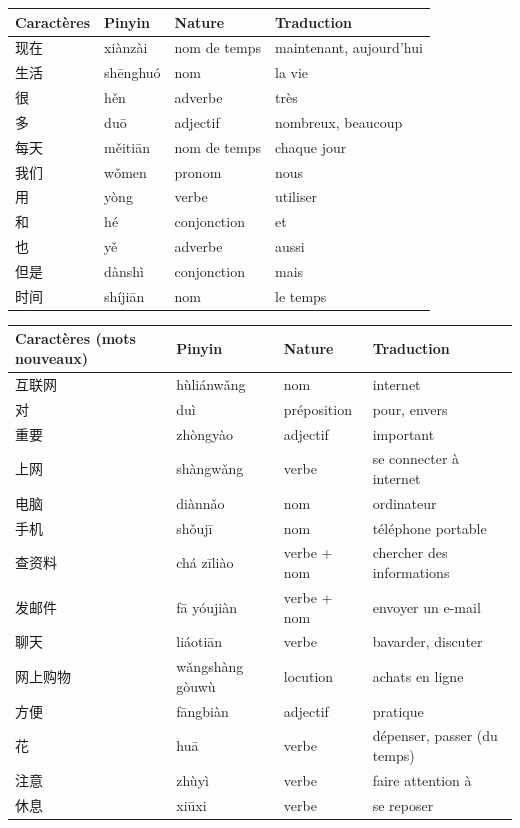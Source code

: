 \documentclass[11pt]{article}
\begin{document}
\begin{center}
\begin{tabularx}{\linewidth}{|X|X|X|X|}
\hline
\rowcolor{popblueL} Caractères & Pinyin & Nature & Traduction \\
\hline
现在 & xiànzài & nom de temps & maintenant, aujourd'hui \\
\hline
生活 & shēnghuó & nom & la vie \\
\hline
很 & hěn & adverbe & très \\
\hline
多 & duō & adjectif & nombreux, beaucoup \\
\hline
每天 & měitiān & nom de temps & chaque jour \\
\hline
我们 & wǒmen & pronom & nous \\
\hline
用 & yòng & verbe & utiliser \\
\hline
和 & hé & conjonction & et \\
\hline
也 & yě & adverbe & aussi \\
\hline
但是 & dànshì & conjonction & mais \\
\hline
时间 & shíjiān & nom & le temps \\
\hline
\end{tabularx}
\end{center}

\begin{center}
\begin{tabularx}{\linewidth}{|X|X|X|X|}
\hline
\rowcolor{poporangeL} Caractères (mots nouveaux) & Pinyin & Nature & Traduction \\
\hline
互联网 & hùliánwǎng & nom & internet \\
\hline
对 & duì & préposition & pour, envers \\
\hline
重要 & zhòngyào & adjectif & important \\
\hline
上网 & shàngwǎng & verbe & se connecter à internet \\
\hline
电脑 & diànnǎo & nom & ordinateur \\
\hline
手机 & shǒujī & nom & téléphone portable \\
\hline
查资料 & chá zīliào & verbe + nom & chercher des informations \\
\hline
发邮件 & fā yóujiàn & verbe + nom & envoyer un e-mail \\
\hline
聊天 & liáotiān & verbe & bavarder, discuter \\
\hline
网上购物 & wǎngshàng gòuwù & locution & achats en ligne \\
\hline
方便 & fāngbiàn & adjectif & pratique \\
\hline
花 & huā & verbe & dépenser, passer (du temps) \\
\hline
注意 & zhùyì & verbe & faire attention à \\
\hline
休息 & xiūxi & verbe & se reposer \\
\hline
\end{tabularx}
\end{center}
\end{document}
